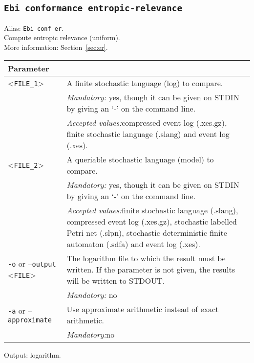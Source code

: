 {\subsection{\texttt{Ebi conformance entropic-relevance}}
\label{command:Ebi conformance entropic-relevance}
Alias: \texttt{Ebi conf er}.\\
Compute entropic relevance (uniform).\\
More information: Section~\ref{sec:er}.\\
\begin{tabularx}{\linewidth}{lX}
\toprule
Parameter \\\midrule
<\texttt{FILE\_1}>&A finite stochastic language (log) to compare.\\
&\textit{Mandatory:} \quad yes, though it can be given on STDIN by giving an `-' on the command line.\\
&\textit{Accepted values:}\quad compressed event log (.xes.gz), finite stochastic language (.slang) and event log (.xes).\\
<\texttt{FILE\_2}>&A queriable stochastic language (model) to compare.\\
&\textit{Mandatory:} \quad yes, though it can be given on STDIN by giving an `-' on the command line.\\
&\textit{Accepted values:}\quad finite stochastic language (.slang), compressed event log (.xes.gz), stochastic labelled Petri net (.slpn), stochastic deterministic finite automaton (.sdfa) and event log (.xes).\\
\texttt{-o} or \texttt{--output} <\texttt{FILE}> &
The logarithm file to which the result must be written. If the parameter is not given, the results will be written to STDOUT.\\
&\textit{Mandatory:} \quad no\\
\texttt{-a} or \texttt{--approximate} & Use approximate arithmetic instead of exact arithmetic.\\
&\textit{Mandatory:}\quad no\\
\bottomrule
\end{tabularx}
Output: logarithm.
}
